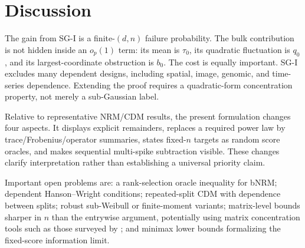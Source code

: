 \section{Discussion}\label{sec:discussion}
The gain from SG-I is a finite-$(d,n)$ failure probability.  The bulk contribution is not hidden inside an $o_p(1)$ term: its mean is $\tau_0$, its quadratic fluctuation is $q_0$, and its largest-coordinate obstruction is $b_0$.  The cost is equally important.  SG-I excludes many dependent designs, including spatial, image, genomic, and time-series dependence.  Extending the proof requires a quadratic-form concentration property, not merely a sub-Gaussian label.

Relative to representative NRM/CDM results, the present formulation changes four aspects.  It displays explicit remainders, replaces a required power law by trace/Frobenius/operator summaries, states fixed-$n$ targets as random score oracles, and makes sequential multi-spike subtraction visible.  These changes clarify interpretation rather than establishing a universal priority claim.

Important open problems are: a rank-selection oracle inequality for bNRM; dependent Hanson--Wright conditions; repeated-split CDM with dependence between splits; robust sub-Weibull or finite-moment variants; matrix-level bounds sharper in $n$ than the entrywise argument, potentially using matrix concentration tools such as those surveyed by \citet{Tropp2015}; and minimax lower bounds formalizing the fixed-score information limit.
